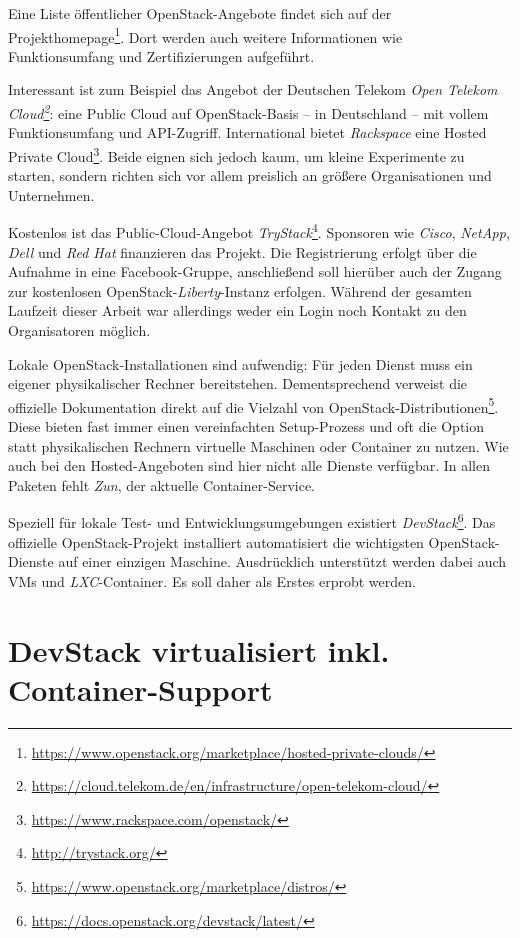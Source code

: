\noindent Eine Liste öffentlicher OpenStack-Angebote findet sich auf der Projekthomepage\footnote{\url{https://www.openstack.org/marketplace/hosted-private-clouds/}}. Dort werden auch weitere Informationen wie Funktionsumfang und Zertifizierungen aufgeführt. 

Interessant ist zum Beispiel das Angebot der Deutschen Telekom \emph{Open Telekom Cloud\footnote{\url{https://cloud.telekom.de/en/infrastructure/open-telekom-cloud/}}}: eine Public Cloud auf OpenStack-Basis -- in Deutschland -- mit vollem Funktionsumfang und API-Zugriff. International bietet \emph{Rackspace} eine Hosted Private Cloud\footnote{\url{https://www.rackspace.com/openstack/}}. Beide eignen sich jedoch kaum, um kleine Experimente zu starten, sondern richten sich vor allem preislich an größere Organisationen und Unternehmen.

Kostenlos ist das Public-Cloud-Angebot \emph{TryStack}\footnote{\url{http://trystack.org/}}. Sponsoren wie \emph{Cisco}, \emph{NetApp}, \emph{Dell} und \emph{Red Hat} finanzieren das Projekt. Die Registrierung erfolgt über die Aufnahme in eine Facebook-Gruppe, anschließend soll hierüber auch der Zugang zur kostenlosen OpenStack-\emph{Liberty}-Instanz erfolgen. Während der gesamten Laufzeit dieser Arbeit war allerdings weder ein Login noch Kontakt zu den Organisatoren möglich.

Lokale OpenStack-Installationen sind aufwendig: Für jeden Dienst muss ein eigener physikalischer Rechner bereitstehen. Dementsprechend verweist die offizielle Dokumentation direkt auf die Vielzahl von OpenStack-Distributionen\footnote{\url{https://www.openstack.org/marketplace/distros/}}. Diese bieten fast immer einen vereinfachten Setup-Prozess und oft die Option statt physikalischen Rechnern virtuelle Maschinen oder Container zu nutzen. Wie auch bei den Hosted-Angeboten sind hier nicht alle Dienste verfügbar. In allen Paketen fehlt \emph{Zun}, der aktuelle Container-Service.

Speziell für lokale Test- und Entwicklungsumgebungen existiert \emph{DevStack}\footnote{\url{https://docs.openstack.org/devstack/latest/}}. Das offizielle OpenStack-Projekt installiert automatisiert die wichtigsten OpenStack-Dienste auf einer einzigen Maschine. Ausdrücklich unterstützt werden dabei auch VMs und \emph{LXC}-Container. Es soll daher als Erstes erprobt werden.


\section{DevStack virtualisiert inkl. Container-Support}

